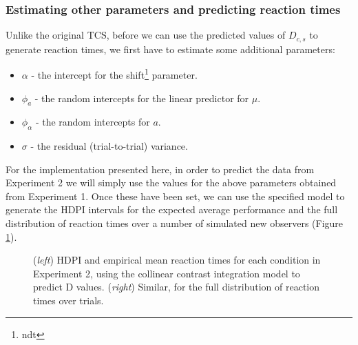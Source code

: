 \documentclass[smallextended, natbib]{svjour3}       %
\begin{document}
\subsubsection{Estimating other parameters and predicting reaction times}

Unlike the original TCS, before we can use the predicted values of $D_{c,s}$ to generate reaction times, we first have to estimate some additional parameters: 

\begin{itemize}	
\item $\alpha$ - the intercept for the shift\footnote{ndt} parameter.
\item $\phi_a$ - the random intercepts for the linear predictor for $\mu$.
\item $\phi_\alpha$ - the random intercepts for $a$.
\item $\sigma$ - the residual (trial-to-trial) variance. 
\end{itemize}

For the implementation presented here, in order to predict the data from Experiment 2 we will simply use the values for the above parameters obtained from Experiment 1. Once these have been set, we can use the specified model to generate the HDPI intervals for the expected average performance and the full distribution of reaction times over a number of simulated new observers (Figure \ref{fig:buetti2019_rt}).

\begin{figure}
\centering
{}
\caption{(\textit{left}) HDPI and empirical mean reaction times for each condition in Experiment 2, using the collinear contrast integration model to predict D values. (\textit{right}) Similar, for the full distribution of reaction times over trials. }
\label{fig:buetti2019_rt}
\end{figure}
\end{document}
